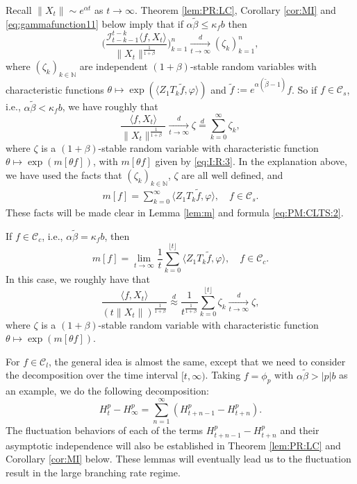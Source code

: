 \documentclass[12pt,a4paper]{amsart}
\theoremstyle{plain}
\theoremstyle{definition}
\numberwithin{equation}{section}
\begin{document}
Recall $\|X_t\|\sim e^{\alpha t}$ as $t\to\infty$.
Theorem \ref{lem:PR:LC}, Corollary \ref{cor:MI} and \eqref{eq:gammafunction11} below imply that if $\alpha \tilde \beta \leq \kappa_f b$ then
\[
  \bigg(\frac{\mathcal I^{t-k}_{t-k-1} \langle f,X_t\rangle}{\|X_t\|^{\frac{1}{1+\beta}}} \bigg)_{k=1}^n
  \xrightarrow [t\to \infty]{d} (\zeta_k)_{k=1}^n,
\]
where $(\zeta_k)_{k \in \mathbb N}$ are independent $(1+\beta)$-stable random variables with characteristic functions $\theta\mapsto \exp( \langle Z_1T_k\tilde f,\varphi  \rangle)$ and $\tilde f:=e^{\alpha(\tilde \beta -1)}f$.
So if $f\in \mathcal C_s$, i.e., $\alpha \tilde \beta < \kappa_f b$, we have roughly that
\[
  \frac{\langle f,X_t\rangle}{\|X_t\|^{\frac{1}{1+\beta}}}
  \xrightarrow[t\to \infty]{d} \zeta\overset{d}{=}\sum_{k=0}^\infty \zeta_k,
\]
where $\zeta$ is a $(1+\beta)$-stable random variable with characteristic function $\theta\mapsto \exp(m[\theta f])$, with $m[\theta f]$ given by \ref{eq:I:R:3}.
In the explanation above, we have used the facts that $(\zeta_k)_{k\in \mathbb N}$, $\zeta$ are all well defined, and
\begin{align}
  \label{eq: equatlity for mf for small rate}
  m[f]
  = \sum_{k=0}^\infty \langle Z_1 T_k \tilde f,\varphi \rangle,\quad f\in\mathcal C_s.
\end{align}
These facts will be made clear in Lemma \ref{lem:m} and formula \eqref{eq:PM:CLTS:2}.


If $f\in \mathcal C_c$, i.e., $\alpha \tilde \beta = \kappa_f b$,
then
\[
  m[f]
  = \lim_{t\rightarrow \infty}\frac{1}{t}\sum_{k=0}^{\lfloor t \rfloor}\langle Z_1 T_k \tilde f,\varphi \rangle,\quad f\in \mathcal C_c.
\]
In this case, we roughly have that
\[
 	\frac{\langle f,X_t\rangle}{(t\|X_t\|)^{\frac{1}{1+\beta}}}
  \overset{d}{\approx} \frac{1}{t^{\frac{1}{1+\beta}}} \sum_{k=0}^{\lfloor t\rfloor} \zeta_k
  \xrightarrow[t\to \infty]{d} \zeta,
\]
where $\zeta$ is a $(1+\beta)$-stable random variable with characteristic function $\theta\mapsto \exp( m[\theta f])$.


For $f\in \mathcal C_l$, the general idea is almost the same, except that we need to consider the decomposition over the time interval $[t,\infty)$.
Taking $f = \phi_p$ with $\alpha \tilde \beta > |p|b$ as an example, we do the following decomposition:
\[
  H^p_t-H^p_\infty
  =\sum^{\infty}_{n=1}(H^p_{t+n-1}-H^p_{t+n}).
\]
The fluctuation behaviors of each of the terms $H_{t+n-1}^p - H_{t+n}^p$ and their asymptotic independence will also be established in Theorem \ref{lem:PR:LC} and Corollary \ref{cor:MI} below.
These lemmas will eventually lead us to the fluctuation result in the large branching rate regime.
\end{document}
